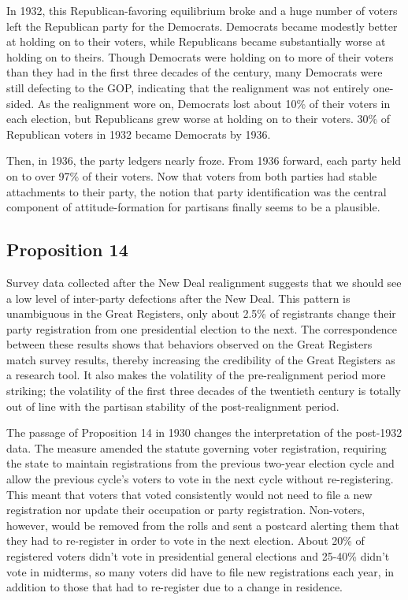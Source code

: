 \documentclass[11pt]{scrartcl}\usepackage[]{graphicx}\usepackage[]{color}
\begin{document}
In 1932, this Republican-favoring equilibrium broke and a huge number of voters left the Republican party for the Democrats. Democrats became modestly better at holding on to their voters, while Republicans became substantially worse at holding on to theirs.  Though Democrats were holding on to more of their voters than they had in the first three decades of the century, many Democrats were still defecting to the GOP, indicating that the realignment was not entirely one-sided. As the realignment wore on, Democrats lost about 10\% of their voters in each election, but Republicans grew worse at holding on to their voters. 30\% of Republican voters in 1932 became Democrats by 1936.   

Then, in 1936, the party ledgers nearly froze. From 1936 forward, each party held on to over 97\% of their voters. Now that voters from both parties had stable attachments to their party, the notion that party identification was the central component of attitude-formation for partisans finally seems to be a plausible.

\subsection*{Proposition 14}

Survey data collected after the New Deal realignment suggests that we should see a low level of inter-party defections after the New Deal. This pattern is unambiguous in the Great Registers, only about 2.5\% of registrants change their party registration from one presidential election to the next. The correspondence between these results shows that behaviors observed on the Great Registers match survey results, thereby increasing the credibility of the Great Registers as a research tool. It also makes the volatility of the pre-realignment period more striking; the volatility of the first three decades of the twentieth century is totally out of line with the partisan stability of the post-realignment period.

The passage of Proposition 14 in 1930 changes the interpretation of the post-1932 data. The measure amended the statute governing voter registration, requiring the state to maintain registrations from the previous two-year election cycle and allow the previous cycle's voters to vote in the next cycle without re-registering. This meant that voters that voted consistently would not  need to file a new registration nor update their occupation or party registration. Non-voters, however, would be removed from the rolls and sent a postcard alerting them that they had to re-register in order to vote in the next election. About 20\% of registered voters didn't vote in presidential general elections and 25-40\% didn't vote in midterms, so many voters did have to file new registrations each year, in addition to those that had to re-register due to a change in residence. 
\end{document}
